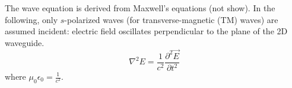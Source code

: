 
The wave equation is derived from Maxwell's equations (not show). In the following, only $s$-polarized waves (for transverse-magnetic (TM) waves) are assumed incident: electric field oscillates perpendicular to the plane of the 2D waveguide.
\cite{1996_soukoulis_dis2d}
\begin{equation}
\nabla^2 E = \frac{1}{c^2} \frac{\partial^2\vec{E}}{\partial t^2}
\label{eq:general_wave_equ}
\end{equation}
where $\mu_0 \epsilon_0 = \frac{1}{c^2}$. 

